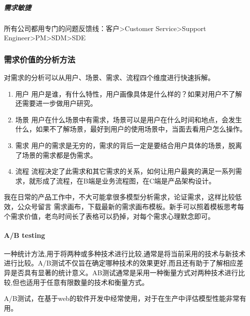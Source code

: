 \documentclass[letterpaper,11pt,english]{sphinxmanual}
\begin{document}
\subparagraph{需求敏捷}
\label{\detokenize{chapter_project/Scrum:id14}}
所有公司都用专门的问题反馈线：客户\sphinxhyphen{}>Customer Service\sphinxhyphen{}>Support
Engineer\sphinxhyphen{}>PM\sphinxhyphen{}>SDM\sphinxhyphen{}>SDE


\subsubsection{需求价值的分析方法}
\label{\detokenize{chapter_project/separate_need:id1}}\label{\detokenize{chapter_project/separate_need::doc}}
对需求的分析可以从用户、场景、需求、流程四个维度进行快速拆解。
\begin{enumerate}
%
\item {} 
用户
用户是谁，有什么特性，用户画像具体是什么样的？如果对用户不了解还需要进一步做用户研究。

\item {} 
场景
用户在什么场景中有需求，场景可以是用户在什么时间和地点，会发生什么，如果不了解场景，最好到用户的使用场景中，当面去看用户怎么操作。

\item {} 
需求
用户的需求是无穷的，需求的背后一定是要结合用户具体的场景，脱离了场景的需求都是伪需求。

\item {} 
流程
流程决定了此需求和其它需求的关系，如何让用户最爽的满足一系列需求，就形成了流程，在B端是业务流程图，在C端是产品架构设计。

\end{enumerate}

我在日常的产品工作中，不大可能拿很多模型分析需求，论证需求，这样比较低效，公众号留言
需求画布，下载最新的需求画布模板。新手可以照着模板思考每个需求价值，老鸟时间长了表格可以扔掉，对每个需求心理默念即可。


\paragraph{A/B testing}
\label{\detokenize{chapter_project/separate_need:a-b-testing}}
一种统计方法,用于将两种或多种技术进行比较,通常是将当前采用的技术与新技术进行比较。A/B测试不仅旨在确定哪种技术的效果更好,而且还有助于了解相应差异是否具有显著的统计意义。AB测试通常是采用一种衡量方式对两种技术进行比较,但也适用于任意有限数量的技术和衡量方式。

A/B测试，在基于web的软件开发中经常使用，对于在生产中评估模型性能非常有用。
\end{document}
